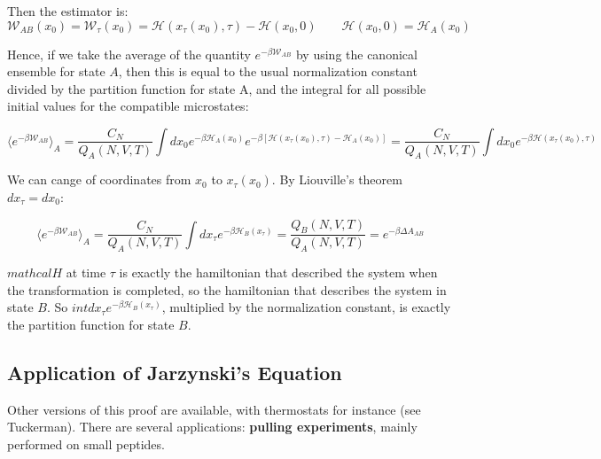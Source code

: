 Then the estimator is:
$$\mathcal{W}_{AB}(x_0) = \mathcal{W}_\tau(x_0) = \mathcal{H}(x_\tau(x_0), \tau)-\mathcal{H}(x_0,0)\qquad \mathcal{H}(x_0, 0) = \mathcal{H}_A(x_0)$$

Hence, if we take the average of the quantity $e^{-\beta\mathcal{W}_{AB}}$ by using the canonical ensemble for state $A$, then this is equal to the usual normalization constant divided by the partition function for state A, and the integral for all possible initial values for the compatible microstates:

$$\langle e^{-\beta\mathcal{W}_{AB}}\rangle_A = \frac{C_N}{Q_A(N, V, T)}\int dx_0e^{-\beta\mathcal{H}_A(x_0)}e^{-\beta[\mathcal{H}(x_\tau(x_0), \tau)-\mathcal{H}_A(x_0)]} = \frac{C_N}{Q_A(N, V, T)}\int dx_0e^{-\beta\mathcal{H}(x_\tau(x_0), \tau)}$$

We can cange of coordinates from $x_0$  to $x_\tau(x_0)$.
By Liouville's theorem $dx_\tau = dx_0$:

$$\langle e^{-\beta\mathcal{W}_{AB}}\rangle_A = \frac{C_N}{Q_A(N, V, T)}\int dx_\tau e^{-\beta\mathcal{H}_B(x_\tau)} = \frac{Q_B(N, V, T)}{Q_A(N, V, T)} = e^{-\beta\Delta A_{AB}}$$

$mathcal{H}$ at time $\tau$ is exactly the hamiltonian that described the system when the transformation is completed, so the hamiltonian that describes the system in state $B$.  
So $int dx_\tau e^{-\beta\mathcal{H}_B(x_\tau)}$, multiplied by the normalization constant, is exactly the partition function for state $B$.

\subsection{Application of Jarzynski's Equation}
Other versions of this proof are available, with thermostats for instance (see Tuckerman).
There are several applications: \textbf{pulling experiments}, mainly performed on small peptides.

